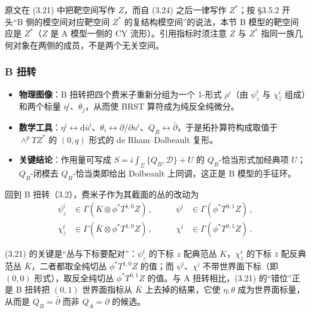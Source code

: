 \begin{yizhu}[易错点]
原文在 (3.21) 中把靶空间写作 $Z$，而自 (3.24) 之后一律写作 $Z^*$；按 §3.5.2 开头“B 侧的模空间对应靶空间 $Z^*$ 的复结构模空间”的说法，本节 B 模型的靶空间应是 $Z^*$（$Z$ 是 A 模型一侧的 CY 流形）。引用指标时须注意 $Z$ 与 $Z^*$ 指同一族几何对象在两侧的成员，不是两个无关空间。
\end{yizhu}

\subsubsection{B 扭转}
\label{sec:3.5.1}

\begin{keytakeaways}
  \begin{itemize}[leftmargin=1.4em,itemsep=2pt,topsep=2pt]
    \item \textbf{物理图像}：B 扭转把四个费米子重新分组为一个 1-形式 $\rho^i$（由 $\psi^i_z$ 与 $\chi^i_{\bar z}$ 组成）和两个标量 $\eta^{\bar\imath}$、$\theta_j$，从而使 BRST 算符成为纯反全纯微分。
    \item \textbf{数学工具}：$\eta^{\bar\imath}\leftrightarrow \mathrm{d}\bar u^{\bar\imath}$、$\theta_i\leftrightarrow \partial/\partial u^i$、$Q_B\leftrightarrow \bar\partial$，于是拓扑算符构成取值于 $\wedge^pTZ^*$ 的 $(0,q)$ 形式的 de Rham--Dolbeault 复形。
    \item \textbf{关键结论}：作用量可写成 $S=i\int_\Sigma\{Q_B,\mathcal{D}\}+U$ 的 $Q_B$-恰当形式加经典项 $U$；$Q_B$-闭模去 $Q_B$-恰当类即给出 Dolbeault 上同调，这正是 B 模型的手征环。
  \end{itemize}
\end{keytakeaways}

回到 B 扭转（3.2），费米子作为其截面的丛的改动为
\begin{equation}\tag{3.21}
\begin{aligned}
\psi^i_z &\in \Gamma(K\otimes\phi^*T^{1,0}Z)\,, &\qquad
\psi^{\bar\imath} &\in \Gamma(\phi^*T^{0,1}Z)\,,\\
\chi^i_{\bar z} &\in \Gamma(\bar K\otimes\phi^*T^{1,0}Z)\,, &\qquad
\chi^{\bar\imath} &\in \Gamma(\phi^*T^{0,1}Z)\,.
\end{aligned}
\end{equation}

\begin{yizhu}[易错点]
(3.21) 的关键是“丛与下标要配对”：$\psi^i_z$ 的下标 $z$ 配典范丛 $K$，$\chi^i_{\bar z}$ 的下标 $\bar z$ 配反典范丛 $\bar K$，二者都取全纯切丛 $\phi^*T^{1,0}Z$ 的值；而 $\psi^{\bar\imath}$、$\chi^{\bar\imath}$ 不带世界面下标（即 $(0,0)$ 形式），取反全纯切丛 $\phi^*T^{0,1}Z$ 的值。与 A 扭转相比，(3.21) 的“错位”正是 B 扭转把 $(0,1)$ 世界面指标从 $\bar K$ 上去掉的结果，它使 $\eta,\theta$ 成为世界面标量，从而是 $Q_B=\bar\partial$ 而非 $Q_A=\partial$ 的候选。
\end{yizhu}


